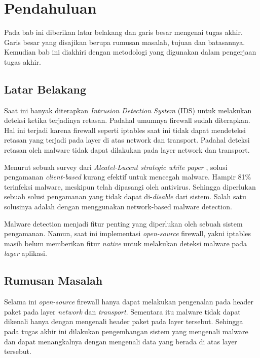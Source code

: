 \chapter{Pendahuluan}

Pada bab ini diberikan latar belakang dan garis besar mengenai tugas akhir. Garis besar yang disajikan berupa rumusan masalah, tujuan dan batasannya. Kemudian bab ini diakhiri dengan metodologi yang digunakan dalam pengerjaan tugas akhir.

\section{Latar Belakang}

Saat ini banyak diterapkan \textit{Intrusion Detection System} (IDS) untuk melakukan deteksi ketika terjadinya retasan. Padahal umumnya firewall sudah diterapkan. Hal ini terjadi karena firewall seperti iptables saat ini tidak dapat mendeteksi retasan yang terjadi pada layer di atas network dan transport. Padahal deteksi retasan oleh malware tidak dapat dilakukan pada layer network dan transport.

Menurut sebuah survey dari \textit{Alcatel-Lucent strategic white paper} \cite{alcatel_lucent_2013}, solusi pengamanan \textit{client-based} kurang efektif untuk mencegah malware. Hampir 81\% terinfeksi malware, meskipun telah dipasangi oleh antivirus. Sehingga diperlukan sebuah solusi pengamanan yang tidak dapat di-\textit{disable} dari sistem. Salah satu solusinya adalah dengan menggunakan network-based malware detection.

Malware detection menjadi fitur penting yang diperlukan oleh sebuah sistem pengamanan. Namun, saat ini implementasi \textit{open-source} firewall, yakni iptables masih belum memberikan fitur \textit{native} untuk melakukan deteksi malware pada \textit{layer} aplikasi.

\section{Rumusan Masalah}

Selama ini \textit{open-source} firewall hanya dapat melakukan pengenalan pada header paket pada layer \textit{network} dan \textit{transport}. Sementara itu malware tidak dapat dikenali hanya dengan mengenali header paket pada layer tersebut. Sehingga pada tugas akhir ini dilakukan pengembangan sistem yang mengenali malware dan dapat menangkalnya dengan mengenali data yang berada di atas layer tersebut.

